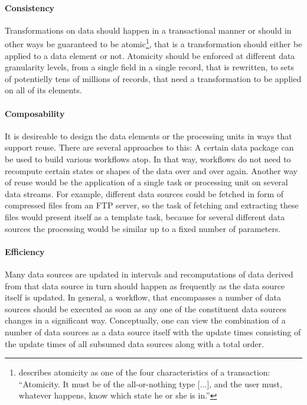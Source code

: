 \documentclass[english]{lni}
\begin{document}
\paragraph{Consistency}
Transformations on data should happen in a transactional manner
or should in other ways be guaranteed to be atomic\footnote{\cite{haerder1983principles} describes atomicity as one of the four characteristics of a transaction: ``Atomicity. It must be of the all-or-nothing type [...], and the user must, whatever happens, know which state he or she is in.''}, that is a transformation
should either be applied to a data element or not. Atomicity should be
enforced at different data granularity levels, from a single field in a
single record, that is rewritten, to sets of potentielly
tens of millions of records, that need a transformation to be
applied on all of its elements.

\paragraph{Composability}
It is desireable to design the data elements or the
processing units in ways that support reuse.
There are several approaches to this: A certain data package can be used to build various
workflows atop. In that way, workflows do not need to recompute
certain states or shapes of the data over and over again. Another way of reuse
would be the application of a single task or processing unit on
several data streams. For example, different data sources could be fetched
in form of compressed files from an FTP server, so the task of fetching and
extracting these files would present itself as a template task, because
for several different data sources the processing would be similar up to a fixed number of parameters.

\paragraph{Efficiency} Many data sources are updated in intervals and
recomputations of data derived from that data source in turn should
happen as frequently as the data source itself is updated. In general,
a workflow, that encompasses a number of data sources should be executed
as soon as any one of the constituent data sources changes in a significant
way. Conceptually, one can view the combination of a number of data sources as a data source
itself with the update times consisting of the update times
of all subsumed data sources along with a total order.
\end{document}
